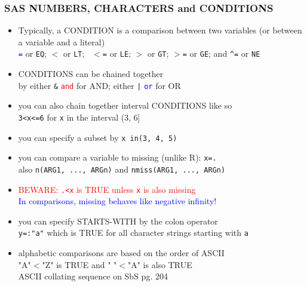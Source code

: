 \documentclass[11pt,pdftex,dvipsnames,usenames,helvetica]{beamer}
\begin{document}
\begin{frame}[fragile]
\frametitle{SAS NUMBERS, CHARACTERS and CONDITIONS}
\begin{itemize}
\item Typically, a CONDITION is a comparison between two variables
  (or between a variable and a literal)\\
  \textcolor{blue}{\tt =} or {\tt EQ}; {\tt $<$} or {\tt LT}; {\tt
    $<$=} or {\tt LE}; {\tt $>$} or {\tt GT}; {\tt $>$=} or {\tt GE};
  and {\tt \textasciicircum=} or {\tt NE} %
\item CONDITIONS can be chained together\\
 by either {\tt \&} 
  \textcolor{red}{\tt and} for AND; either {\tt |}
  \textcolor{blue}{\tt or} for OR
\item you can also chain together interval CONDITIONS like so\\
{\tt 3<x<=6} for {\tt x} in the interval (3, 6]
\item you can specify a subset by {\tt x in(3, 4, 5)}
\item you can compare a variable to missing (unlike R): {\tt x=.}\\
also {\tt n(ARG1, ..., ARGn)} and {\tt nmiss(ARG1, ..., ARGn)} 
\item \textcolor{red}{BEWARE:  {\tt .<x} is TRUE unless {\tt x} is also 
missing}\\
\textcolor{blue}{In comparisons, missing behaves like negative infinity!}
\item you can specify STARTS-WITH by the colon operator\\ {\tt y=:"a"}
  which is TRUE for all character strings starting with {\tt a}
\item alphabetic comparisons are based on the order of ASCII\\
"A"$<$"Z" is TRUE and " "$<$"A" is also TRUE\\
ASCII collating sequence on SbS pg. 204
\end{itemize}
\end{frame}
\end{document}
